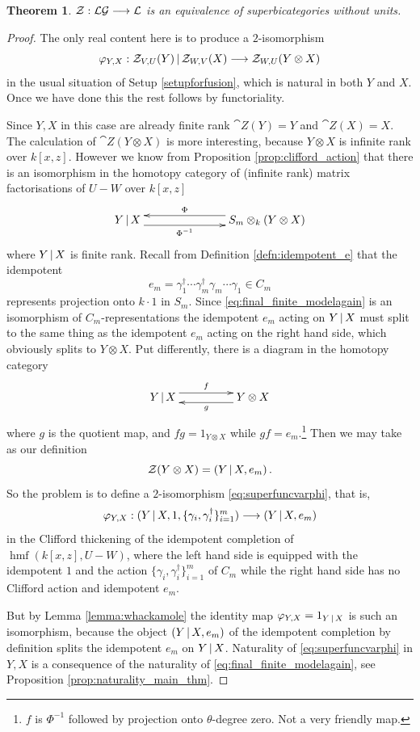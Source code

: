 \documentclass[english,letter paper,12pt,leqno]{article}
\newtheorem{theorem}{Theorem}[section]
\theoremstyle{example}
\numberwithin{equation}{section}
\def\LG{\mathcal{LG}}
\def\be{\begin{equation}}
\def\ee{\end{equation}}
\DeclareMathOperator{\hmf}{hmf}
\begin{document}
\begin{theorem} $\cat{Z}: \LG \lto \cat{L}$ is an equivalence of superbicategories without units.
\end{theorem}
\begin{proof}
The only real content here is to produce a $2$-isomorphism
\be\label{eq:superfuncvarphi}
\varphi_{Y,X}: \cat{Z}_{V,U}(Y) \l \cat{Z}_{W,V}(X) \lto \cat{Z}_{W,U}( Y \otimes X )
\ee
in the usual situation of Setup \ref{setupforfusion}, which is natural in both $Y$ and $X$. Once we have done this the rest follows by functoriality.

Since $Y,X$ in this case are already finite rank $\cat{Z}(Y) = Y$ and $\cat{Z}(X) = X$.  The calculation of $\cat{Z}( Y \otimes X )$ is more interesting, because $Y \otimes X$ is infinite rank over $k[x,z]$. However we know from Proposition \ref{prop:clifford_action} that there is an isomorphism in the homotopy category of (infinite rank) matrix factorisations of $U - W$ over $k[x,z]$
\begin{equation}\label{eq:final_finite_modelagain}
\xymatrix@C+4pc{
Y \l X \ar@<-1ex>[r]_-{\Phi^{-1}} & S_m \otimes_k ( Y \otimes X )\ar@<-1ex>[l]_-{\Phi}
}
\end{equation}
where $Y \,|\, X$ is finite rank. Recall from Definition \ref{defn:idempotent_e} that the idempotent
\[
e_m = \gamma_1^\dagger \cdots \gamma_m^\dagger \gamma_m \cdots \gamma_1 \in C_m
\]
represents projection onto $k \cdot 1$ in $S_m$. Since \eqref{eq:final_finite_modelagain} is an isomorphism of $C_m$-representations the idempotent $e_m$ acting on $Y \,|\, X$ must split to the same thing as the idempotent $e_m$ acting on the right hand side, which obviously splits to $Y \otimes X$. Put differently, there is a diagram in the homotopy category
\[
\xymatrix@C+2pc{
Y \l X \ar@<1ex>[r]^-{f} & Y \otimes X \ar@<1ex>[l]^-{g}
}
\]
where $g$ is the quotient map, and $f g = 1_{Y \otimes X}$ while $g f = e_m$.\footnote{$f$ is $\Phi^{-1}$ followed by projection onto $\theta$-degree zero. Not a very friendly map.} Then we may take as our definition
\[
\mathcal{Z}( Y \otimes X ) = (Y \,|\, X, e_m)\,.
\]
So the problem is to define a $2$-isomorphism \eqref{eq:superfuncvarphi}, that is,
\[
\varphi_{Y,X}: (Y \,|\, X, 1, \{ \gamma_i, \gamma_i^\dagger \}_{i=1}^m) \longrightarrow (Y \,|\, X, e_m)
\]
in the Clifford thickening of the idempotent completion of $\hmf(k[x,z],U - W)$, where the left hand side is equipped with the idempotent $1$ and the action $\{ \gamma_i, \gamma_i^\dagger \}_{i=1}^m$ of $C_m$ while the right hand side has no Clifford action and idempotent $e_m$.

But by Lemma \ref{lemma:whackamole} the identity map $\varphi_{Y,X} = 1_{Y \,|\, X}$ is such an isomorphism, because the object $(Y \,|\, X, e_m)$ of the idempotent completion by definition splits the idempotent $e_m$ on $Y \,|\, X$. Naturality of \eqref{eq:superfuncvarphi} in $Y,X$ is a consequence of the naturality of \eqref{eq:final_finite_modelagain}, see Proposition \ref{prop:naturality_main_thm}.
\end{proof}
\end{document}
